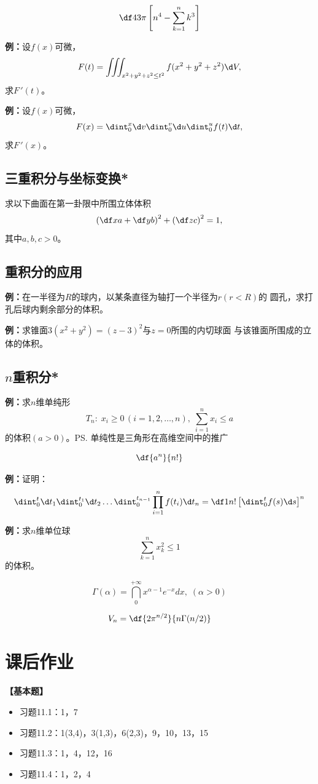 $${\df 43\pi\left[n^4-\sum\limits_{k=1}^nk^3\right]}$$

{\bf 例：}设$f(x)$可微，
$$F(t)=\iiint_{x^2+y^2+z^2\leq t^2}f(x^2+y^2+z^2)\d V,$$
求$F\,'(t)$。

{\bf 例：}设$f(x)$可微，
$$F(x)=\dint_0^x\d v\dint_0^v\d u\dint_0^uf(t)\d t,$$
求$F\,'(x)$。

\subsection{三重积分与坐标变换*}

求以下曲面在第一卦限中所围立体体积
$$\left(\df xa+\df yb\right)^2+\left(\df zc\right)^2=1,$$
其中$a,b,c>0$。

\subsection{重积分的应用}

{\bf 例：}在一半径为$R$的球内，以某条直径为轴打一个半径为$r(r<R)$的
圆孔，求打孔后球内剩余部分的体积。

{\bf 例：}求锥面$3(x^2+y^2)=(z-3)^2$与$z=0$所围的内切球面
与该锥面所围成的立体的体积。

\subsection{$n$重积分*}

{\bf 例：}求$n$维单纯形
$$T_n:\; x_i\geq 0\,(i=1,2,\ldots,n),\;
\sum\limits_{i=1}^nx_i\leq a$$
的体积$(a>0)$。\ps{单纯性是三角形在高维空间中的推广}

$$\df{a^n}{n!}$$

{\bf 例：}证明：
$$\dint_0^t\d t_1\dint_0^{t_1}\d t_2\ldots
\dint_0^{t_{n-1}}\prod\limits_{i=1}^nf(t_i)\d t_n
=\df 1{n!}\left[\dint_0^tf(s)\d s\right]^n$$

{\bf 例：}求$n$维单位球
$$\sum\limits_{k=1}^nx_k^2\leq 1$$
的体积。

$${\Gamma(\alpha)=\dint_0^{+\infty}x^{\alpha-1}e^{-x}dx,\;(\alpha>0)}$$

$${V_n=\df{2\pi^{n/2}}{n\Gamma(n/2)}}$$

\newpage

\section*{课后作业}

{\bf 【基本题】}

\begin{itemize}
  \setlength{\itemindent}{1cm}
  \item 习题11.1：1，7
  \item 习题11.2：1(3,4)，3(1,3)，6(2,3)，9，10，13，15
  \item 习题11.3：1，4，12，16
  \item 习题11.4：1，2，4
\end{itemize}

